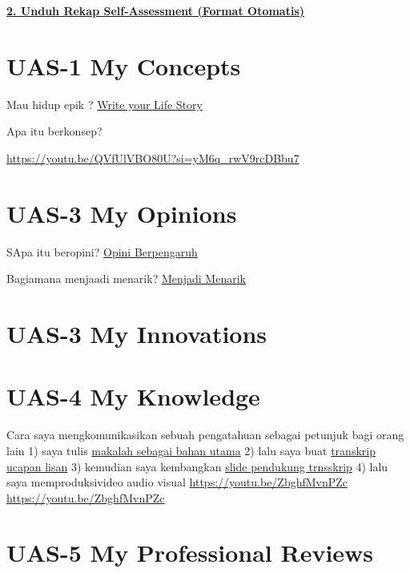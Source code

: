 \documentclass[
  letterpaper,
  DIV=11,
  numbers=noendperiod]{scrreprt}
\begin{document}
\href{./Self-Assessment_UTS-1_s_d__UTS-5__dibuat_otomatis_.csv}{\textbf{2.
Unduh Rekap Self-Assessment (Format Otomatis)}}


\chapter{UAS-1 My Concepts}\label{uas-1-my-concepts}

Mau hidup epik ? \href{lifestory.pdf}{Write your Life Story}

Apa itu berkonsep?

\url{https://youtu.be/QVfUlVBO80U?si=yM6q_rwV9rcDBbu7}


\chapter{UAS-3 My Opinions}\label{uas-3-my-opinions}

SApa itu beropini? \href{BM\%20Opini.mp4}{Opini Berpengaruh}

Bagiamana menjaadi menarik? \href{./Interesting.mp4}{Menjadi Menarik}


\chapter{UAS-3 My Innovations}\label{uas-3-my-innovations}


\chapter{UAS-4 My Knowledge}\label{uas-4-my-knowledge}

Cara saya mengkomunikasikan sebuah pengatahuan sebagai petunjuk bagi
orang lain 1) saya tulis
\href{Rekomendasi\%20Presentasi\%20Efektif(Contoh\%20Makalah).pdf}{makalah
sebagai bahan utama} 2) lalu saya buat
\href{Contoh\%20Transkrip\%20Presentasi.pdf}{transkrip ucapan lisan} 3)
kemudian saya kembangkan
\href{Rekomendasi\%20Presentasi\%20(Contoh\%20Slides).pdf}{slide
pendukung trnsskrip} 4) lalu saya memproduksivideo audio visual
\url{https://youtu.be/ZbghfMvnPZc} \url{https://youtu.be/ZbghfMvnPZc}


\chapter{UAS-5 My Professional
Reviews}\label{uas-5-my-professional-reviews}
\end{document}
